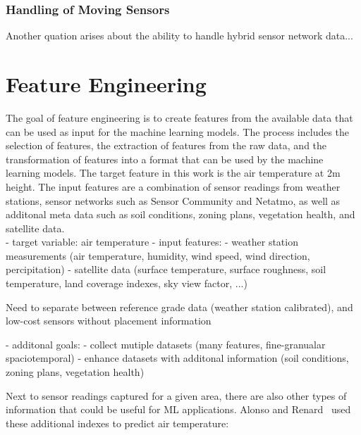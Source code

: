 \subsubsection{Handling of Moving Sensors}

Another quation arises about the ability to handle hybrid sensor network data...

\section{Feature Engineering}
\label{sec:feature_engineering}

The goal of feature engineering is to create features from the available data that can be used as input for the machine learning models. The process includes the selection of features, the extraction of features from the raw data, and the transformation of features into a format that can be used by the machine learning models.
The target feature in this work is the air temperature at 2m height. The input features are a combination of sensor readings from weather stations, sensor networks such as Sensor Community and Netatmo, as well as additonal meta data such as soil conditions, zoning plans, vegetation health, and satellite data.\\

- target variable: air temperature
- input features:
    - weather station measurements (air temperature, humidity, wind speed, wind direction, percipitation)
    - satellite data (surface temperature, surface roughness, soil temperature, land coverage indexes, sky view factor, ...)

    Need to separate between reference grade data (weather station calibrated), and low-cost sensors without placement information

- additonal goals:
    - collect mutiple datasets (many features, fine-granualar spaciotemporal)
    - enhance datasets with additonal information (soil conditions, zoning plans, vegetation health)


Next to sensor readings captured for a given area, there are also other types of information that could be useful for ML applications. Alonso and Renard~\cite{alonso2020new} used these additional indexes to predict air temperature:

